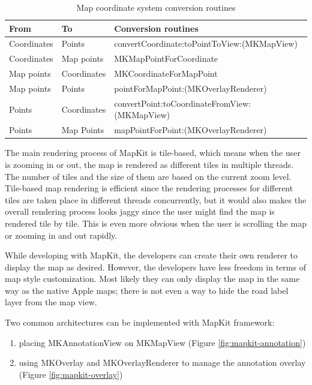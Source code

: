 \documentclass[12pt,a4paper]{article}
\renewcommand\texttt[1]{{\ttfamily\color{textttColor}#1}}
\begin{document}
                \begin{table}
                    \begin{tabular}{ | p{2.4cm} p{2.4cm} l | }
                    \hline
                    \textbf{From} & \textbf{To} & \textbf{Conversion routines}\\
                    \hline
                    Coordinates & Points & \texttt{convertCoordinate:toPointToView:(MKMapView)}\\
                    Coordinates & Map points & \texttt{MKMapPointForCoordinate}\\
                    Map points & Coordinates & \texttt{MKCoordinateForMapPoint}\\
                    Map points & Points & \texttt{pointForMapPoint:(MKOverlayRenderer)}\\
                    Points & Coordinates & \texttt{convertPoint:toCoordinateFromView:(MKMapView)}\\
                    Points & Map Points & \texttt{mapPointForPoint:(MKOverlayRenderer)}\\
                    \hline
                    \end{tabular}
                    \caption{Map coordinate system conversion routines}
                    \label{table:mapkit-conversions}
                \end{table}
                
                The main rendering process of MapKit is tile-based, which means when the user is zooming in or out, the map is rendered as different tiles in multiple threads. The number of tiles and the size of them are based on the current zoom level. Tile-based map rendering is efficient since the rendering processes for different tiles are taken place in different threads concurrently, but it would also makes the overall rendering process looks jaggy since the user might find the map is rendered tile by tile. This is even more obvious when the user is scrolling the map or zooming in and out rapidly.
                
                While developing with MapKit, the developers can create their own renderer to display the map as desired. However, the developers have less freedom in terms of map style customization. Most likely they can only display the map in the same way as the native Apple maps; there is not even a way to hide the road label layer from the map view.
                
                Two common architectures can be implemented with MapKit framework:
                \begin{enumerate}
                    \setlength\itemsep{-0.5em}
                    \item placing \texttt{MKAnnotationView} on \texttt{MKMapView} (Figure \ref{fig:mapkit-annotation})
                    \item using \texttt{MKOverlay} and \texttt{MKOverlayRenderer} to manage the annotation overlay (Figure \ref{fig:mapkit-overlay})
                \end{enumerate}
                
\end{document}
